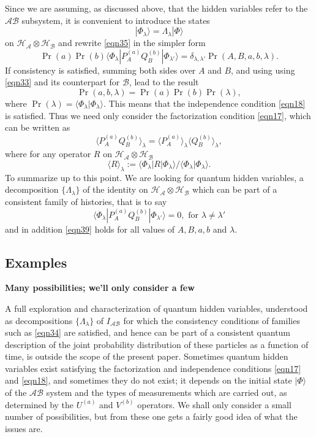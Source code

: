 \documentclass[10pt]{article} %
\def\outl#1{\par{\medskip\noindent\hspace*{.5cm}\bf
      \mathversion{bold}#1\mathversion{normal}\smallskip} }
\def\np{} \def\xa{} \def\xb{} \def\xn{} \def\xp{}
\def\outl#1{} \def\np{} \def\xa{} \def\xb{} \def\xn{} \def\xp{}
\def\outl#1{\par{\medskip\noindent\hspace*{.5cm}\bf
      \mathversion{bold}#1\mathversion{normal}\smallskip} }
\def\np{\newpage }\def\xn{\nopagebreak }\def\xp{\pagebreak }
\newcommand{\avg}[1]{\langle #1\rangle }
\newcommand{\inp}[1]{\lgl#1|#1\rgl }
\newcommand{\ket}[1]{|#1\rgl }
\newcommand{\lgl}{\langle }
\newcommand{\mte}[2]{\lgl#1|#2|#1\rgl }
\newcommand{\mted}[3]{\lgl#1|#2|#3\rgl }
\newcommand{\ot}{\otimes }
\newcommand{\rgl}{\rangle }
\newcommand{\AM}{{\mathcal A}}
\newcommand{\BM}{{\mathcal B}}
\newcommand{\HM}{{\mathcal H}}
\newcommand{\dl}{\delta }
\newcommand{\lm}{\lambda }
\newcommand{\Lm}{\Lambda }
\begin{document}
Since we are assuming, as discussed above, that the hidden variables refer to
the $\AM\BM$ subsystem, it is convenient to introduce the states
\begin{equation}
  \ket{\Phi_\lm} = \Lm_\lm\ket{\Phi}
\label{eqn36}
\end{equation}
on $\HM_\AM\ot\HM_\BM$ and rewrite \eqref{eqn35}
in the simpler form
\begin{equation}
  \Pr(a)\Pr(b)\mted{\Phi_\lm}{P^{(a)}_AQ^{(b)}_B}{\Phi_{\lm'}} =
 \dl_{\lm,\lm'} \Pr(A,B,a,b,\lm).
\label{eqn37}
\end{equation}
If consistency is satisfied, summing both sides over $A$ and $B$, and using
using \eqref{eqn33} and its counterpart for $\BM$, lead to the result
\begin{equation}
  \Pr(a,b,\lm) = \Pr(a)\Pr(b)\Pr(\lm),
\label{eqn38}
\end{equation}
where $\Pr(\lm)=\inp{\Phi_\lm}$.  This means that the independence condition
\eqref{eqn18} is satisfied.  Thus we need only consider 
the factorization condition \eqref{eqn17}, which can be written as
\begin{equation}
  \avg{P^{(a)}_AQ^{(b)}_B}_\lm =\avg{P^{(a)}_A}_\lm \avg{Q^{(b)}_B}_\lm,
\label{eqn39}
\end{equation}
where for any operator $R$ on $\HM_\AM\ot \HM_\BM$
\begin{equation}
  \avg{R}_\lm := \mte{\Phi_\lm}{R}/\inp{\Phi_\lm}.
\label{eqn40}
\end{equation}
To summarize up to this point.  We are looking for quantum hidden variables, a
decomposition $\{\Lm_\lm\}$ of the identity on $\HM_\AM\ot \HM_\BM$ which can be
part of a consistent family of histories, that is to say
\begin{equation}
  \mted{\Phi_\lm}{P^{(a)}_AQ^{(b)}_B}{\Phi_{\lm'}} = 0,
   \text{ for } \lm\neq\lm'
\label{eqn41}
\end{equation}
and in addition \eqref{eqn39} holds for all values of $A,B,a,b$ and $\lm$.

\xb
\subsection{Examples}
\label{sct5d}
\xa

\xb
\outl{Many possibilities; we'll only consider a few}
\xa




A full exploration and characterization of quantum hidden variables,
understood as decompositions $\{\Lm_\lm\}$ of $I_{\AM\BM}$ for which the
consistency conditions of families such as \eqref{eqn34} are satisfied, and
hence can be part of a consistent quantum description of the joint probability
distribution of these particles as a function of time, is outside the scope of
the present paper.  Sometimes quantum hidden variables exist satisfying the
factorization and independence conditions \eqref{eqn17} and \eqref{eqn18}, and
sometimes they do not exist; it depends on the initial state $\ket{\Phi}$ of
the $\AM\BM$ system and the types of measurements which are carried out, as
determined by the $U^{(a)}$ and $V^{(b)}$ operators.  We shall only consider a
small number of possibilities, but from these one gets a fairly good idea
of what the issues are.
\end{document}
